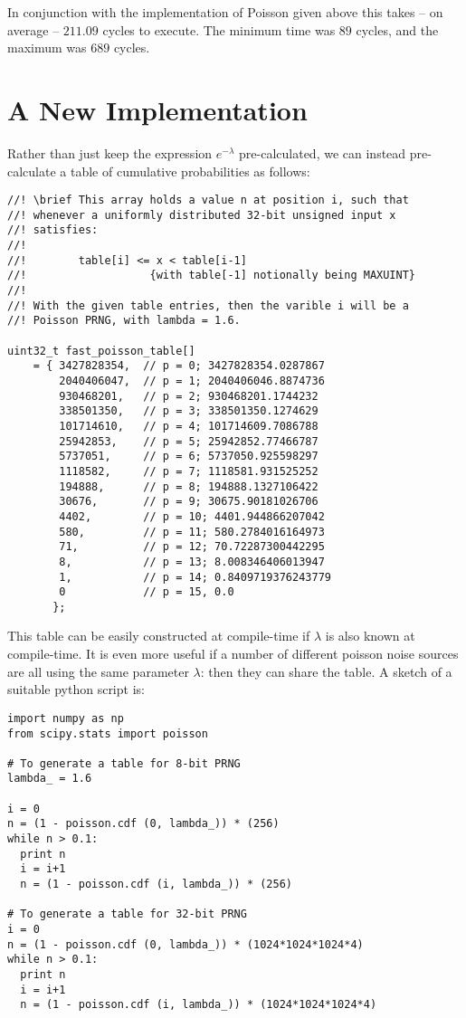 In conjunction with the implementation of Poisson given above this
takes -- on average -- $211.09$ cycles to execute. The minimum time was
$89$ cycles, and the maximum was $689$ cycles.

\section{A New Implementation}
Rather than just keep the expression $e^{-\lambda}$ pre-calculated, we
can instead pre-calculate a table of cumulative probabilities as
follows:
\begin{verbatim}
//! \brief This array holds a value n at position i, such that
//! whenever a uniformly distributed 32-bit unsigned input x
//! satisfies:
//!
//!        table[i] <= x < table[i-1]
//!                   {with table[-1] notionally being MAXUINT}
//!
//! With the given table entries, then the varible i will be a
//! Poisson PRNG, with lambda = 1.6.

uint32_t fast_poisson_table[]
    = { 3427828354,  // p = 0; 3427828354.0287867
        2040406047,  // p = 1; 2040406046.8874736
        930468201,   // p = 2; 930468201.1744232
        338501350,   // p = 3; 338501350.1274629
        101714610,   // p = 4; 101714609.7086788
        25942853,    // p = 5; 25942852.77466787
        5737051,     // p = 6; 5737050.925598297
        1118582,     // p = 7; 1118581.931525252
        194888,      // p = 8; 194888.1327106422
        30676,       // p = 9; 30675.90181026706
        4402,        // p = 10; 4401.944866207042
        580,         // p = 11; 580.2784016164973
        71,          // p = 12; 70.72287300442295
        8,           // p = 13; 8.008346406013947
        1,           // p = 14; 0.8409719376243779
        0            // p = 15, 0.0
       };
\end{verbatim}
This table can be easily constructed at compile-time if $\lambda$ is also
known at compile-time. It is even more useful if a number of different
poisson noise sources are all using the same parameter $\lambda$: then
they can share the table. A sketch of a suitable python script is:
\begin{verbatim}
import numpy as np
from scipy.stats import poisson

# To generate a table for 8-bit PRNG
lambda_ = 1.6

i = 0
n = (1 - poisson.cdf (0, lambda_)) * (256)
while n > 0.1:
  print n
  i = i+1
  n = (1 - poisson.cdf (i, lambda_)) * (256)

# To generate a table for 32-bit PRNG
i = 0
n = (1 - poisson.cdf (0, lambda_)) * (1024*1024*1024*4)
while n > 0.1:
  print n
  i = i+1
  n = (1 - poisson.cdf (i, lambda_)) * (1024*1024*1024*4)
\end{verbatim}


